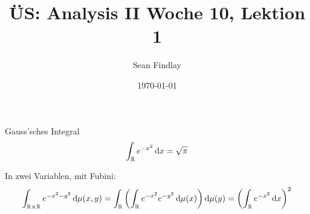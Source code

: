 \documentclass[12pt]{article}
\title{ÜS: Analysis II Woche 10, Lektion 1}
\author{Sean Findlay}
\date{\today}
\begin{document}
\maketitle

\begin{example}{Gauss'sches Integral}{}
    $$
    \begin{aligned}
        \int_{\mathbb{R}} e^{-x^2} \mathop{}\!\mathrm{d} x = \sqrt{\pi}
    \end{aligned}
    $$

    In zwei Variablen, mit Fubini:
    $$
    \begin{aligned}
        \int_{\mathbb{R} \times \mathbb{R}} e^{-x^2-y^2} \mathop{}\!\mathrm{d} \mu(x, y) = \int_{\mathbb{R}} \left(\int_{\mathbb{R}} e^{-x^2} e^{-y^2} \mathop{}\!\mathrm{d} \mu(x)\right) \mathop{}\!\mathrm{d} \mu(y) = \left(\int_{\mathbb{R}} e^{-x^2} \mathop{}\!\mathrm{d} x\right)^2
    \end{aligned}
    $$
\end{example}
\end{document}
